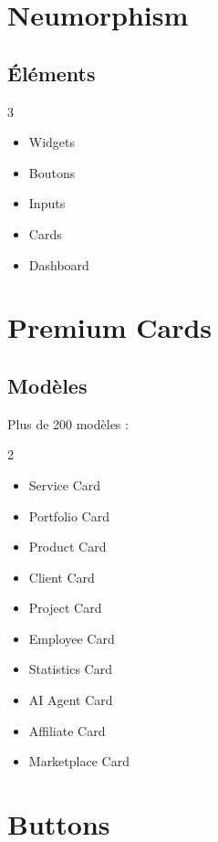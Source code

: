 \documentclass[12pt,a4paper,oneside]{book}
\begin{document}
\chapter{Neumorphism}

\section{Éléments}
\begin{multicols}{3}
\begin{itemize}
\item Widgets
\item Boutons
\item Inputs
\item Cards
\item Dashboard
\end{itemize}
\end{multicols}

\chapter{Premium Cards}

\section{Modèles}
Plus de 200 modèles :
\begin{multicols}{2}
\begin{itemize}
\item Service Card
\item Portfolio Card
\item Product Card
\item Client Card
\item Project Card
\item Employee Card
\item Statistics Card
\item AI Agent Card
\item Affiliate Card
\item Marketplace Card
\end{itemize}
\end{multicols}

\chapter{Buttons}
\end{document}
